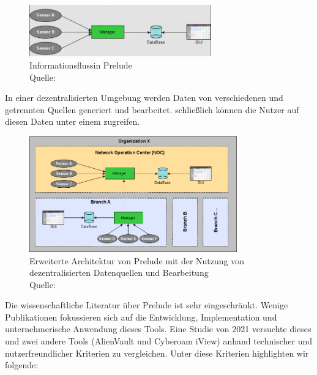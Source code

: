 \begin{figure}[H]
   \centering
   \includegraphics[width=0.7\textwidth]{assets/2_p4.png}
   \caption[Informationsfluss in Prelude]
   {Informationsflussin Prelude \\Quelle: \citep{Prelude_MU} }
   \centering
\end{figure}

In einer dezentralisierten Umgebung werden Daten von verschiedenen und getrennten Quellen generiert und bearbeitet. schließlich können die Nutzer auf diesen Daten unter einem  zugreifen.

\begin{figure}[H]
   \centering
   \includegraphics[width=0.8\textwidth]{assets/2_p5.png}
   \caption[Erweiterte Architektur von Prelude mit der Nutzung von dezentralisierten Datenquellen und Bearbeitung]
   {Erweiterte Architektur von Prelude mit der Nutzung von dezentralisierten Datenquellen und Bearbeitung\\Quelle: \citep{Prelude_MU} }
   \centering
\end{figure}

Die wissenschaftliche Literatur über Prelude ist sehr eingeschränkt. Wenige Publikationen fokussieren sich auf die Entwicklung, Implementation und unternehmerische Anwendung dieses Tools. Eine Studie von 2021 versuchte dieses und zwei andere Tools (AlienVault und Cyberoam iView) anhand technischer und nutzerfreundlicher Kriterien zu vergleichen. Unter diese Kriterien highlighten wir folgende\citep{Grammatikis_Prelude}: 

